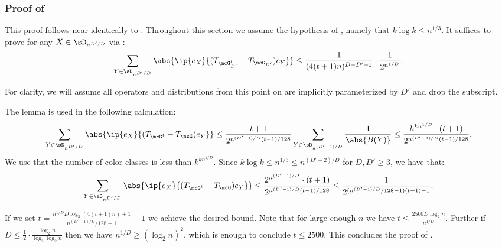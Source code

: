 \subsubsection{Proof of }
\label{sec:genmaintrick}

This proof follows near identically to . Throughout this section we assume the hypothesis of , namely that $k\log k\leq n^{1/3}$. It suffices to prove for any $X \in \sD_{n^{D'/D}}$ via :
\begin{equation*}
    \sum_{Y \in \sD_{n^{D'/D}}} \abs{\ip{e_X}{(T_{\mcG^t_{D'}}-T_{\mcG_{D'}}) e_Y}} \leq \frac{1}{(4(t+1)n)^{D-D'+1}}\cdot\frac1{2^{n^{1/D}}}.
\end{equation*}

For clarity, we will assume all operators and distributions from this point on are implicitly parameterized by $D'$ and drop the subscript.

The lemma is used in the following calculation:
\begin{equation*}
    \sum_{Y \in \sD_{n^{D'/D}}} \abs{\ip{e_X}{(T_{\mcG^t}-T_{\mcG}) e_Y}} \leq \frac{t+1}{2^{n^{(D'-1)/D}(t-1)/128}} \sum_{Y \in \sD_{n^{(D'-1)/D}}} \frac{1}{\abs{B(Y)}} \leq \frac{k^{kn^{1/D}} \cdot (t+1)}{2^{n^{(D'-1)/D}(t-1)/128}}.
\end{equation*}
We use that the number of color classes is less than $k^{kn^{1/D}}$. Since $k \log k \leq n^{1/3} \leq n^{(D'-2)/D}$ for $D, D' \geq 3$, we have that:
\begin{equation*}
    \sum_{Y \in \sD_{n^{D'/D}}} \abs{\ip{e_X}{(T_{\mcG^t}-T_{\mcG}) e_Y}} \leq \frac{2^{n^{(D'-1)/D}} \cdot (t+1)}{2^{n^{(D'-1)/D}(t-1)/128}} \leq \frac{1}{2^{(n^{(D'-1)/D}/128-1)(t-1)-1}}.
\end{equation*}

If we set $t = \frac{n^{1/D}D\log_2 (4(t+1)n)+1}{n^{(D'-1)/D}/128-1}+1$ we achieve the desired bound. Note that for large enough $n$ we have $t \leq \frac{2500 D \log_2 n}{n^{1/D}}$. Further if $D \leq \frac{1}{2} \cdot\frac{\log_2 n}{\log_2 \log_2 n}$ then we have $n^{1/D} \geq (\log_2 n)^2$, which is enough to conclude $t \leq 2500$. This concludes the proof of .

